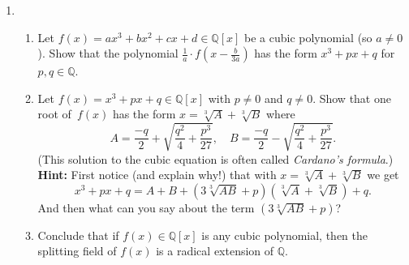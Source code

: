 \documentclass[11pt]{article}
\begin{document}
\begin{enumerate}
\item \begin{enumerate}
\item Let $f(x) = ax^3+bx^2+cx+d \in \mathbb{Q}[x]$ be a cubic polynomial (so $a \neq 0$). Show that the polynomial $\frac{1}{a} \cdot f(x-\frac{b}{3a})$ has the form $x^3+px+q$ for $p,q\in \mathbb{Q}$.
\item Let $f(x) = x^3+px+q\in \mathbb{Q}[x]$ with $p\neq 0$ and $q\neq 0$. Show that one root of~$f(x)$ has the form $x=\sqrt[3]{A}+\sqrt[3]{B}$ where 
\[ A = \frac{-q}{2} + \sqrt{\frac{q^2}{4}+\frac{p^3}{27}}, \quad B = \frac{-q}{2} - \sqrt{\frac{q^2}{4}+\frac{p^3}{27}}.\]
(This solution to the cubic equation is often called \emph{Cardano's formula}.) \\
{\bf Hint:} First notice (and explain why!) that with $x=\sqrt[3]{A}+\sqrt[3]{B}$ we get 
\[ x^3+px+q = A+B+(3\sqrt[3]{AB}+p)(\sqrt[3]{A}+\sqrt[3]{B})+q.\]
And then what can you say about the term $(3\sqrt[3]{AB}+p)$?
\item Conclude that if $f(x) \in \mathbb{Q}[x]$ is any cubic polynomial, then the splitting field of $f(x)$ is a radical extension of $\mathbb{Q}$.
\end{enumerate}

\end{enumerate}
\end{document}
